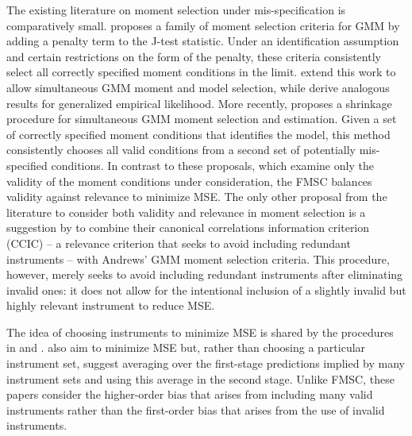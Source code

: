 The existing literature on moment selection under mis-specification is comparatively small. 
\cite{Andrews1999} proposes a family of moment selection criteria for GMM by adding a penalty term to the J-test statistic. 
Under an identification assumption and certain restrictions on the form of the penalty, these criteria consistently select all correctly specified moment conditions in the limit. 
\cite{AndrewsLu} extend this work to allow simultaneous GMM moment and model selection, while \cite{HongPrestonShum} derive analogous results for generalized empirical likelihood. 
More recently, \cite{Liao} proposes a shrinkage procedure for simultaneous GMM moment selection and estimation. 
Given a set of correctly specified moment conditions that identifies the model, this method consistently chooses all valid conditions from a second set of potentially mis-specified conditions.
In contrast to these proposals, which examine only the validity of the moment conditions under consideration, the FMSC balances validity against relevance to minimize MSE. 
The only other proposal from the literature to consider both validity and relevance in moment selection is a suggestion by \cite{HallPeixe2003} to combine their canonical correlations information criterion (CCIC) -- a relevance criterion that seeks to avoid including redundant instruments -- with Andrews' GMM moment selection criteria. 
This procedure, however, merely seeks to avoid including redundant instruments after eliminating invalid ones: it does not allow for the intentional inclusion of a slightly invalid but highly relevant instrument to reduce MSE. 


The idea of choosing instruments to minimize MSE is shared by the procedures in \cite{DonaldNewey2001} and \cite{DonaldImbensNewey2009}. 
\cite{KuersteinerOkui2010} also aim to minimize MSE but, rather than choosing a particular instrument set, suggest averaging over the first-stage predictions implied by many instrument sets and using this average in the second stage. 
Unlike FMSC, these papers consider the higher-order bias that arises from including many valid instruments rather than the first-order bias that arises from the use of invalid instruments.

